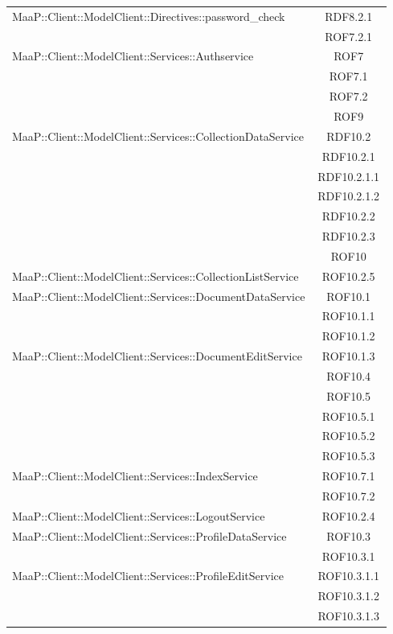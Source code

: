 \begin{center}
\begin{longtable}{|p{0.8\linewidth}|c|}
\midrule
MaaP::Client::ModelClient::Directives::password\_check
& RDF8.2.1\\
& ROF7.2.1\\

\midrule
MaaP::Client::ModelClient::Services::Authservice
& ROF7\\
& ROF7.1\\
& ROF7.2\\
& ROF9\\

\midrule
MaaP::Client::ModelClient::Services::CollectionDataService
& RDF10.2\\
& RDF10.2.1\\
& RDF10.2.1.1\\
& RDF10.2.1.2\\
& RDF10.2.2\\
& RDF10.2.3\\
& ROF10\\

\midrule
MaaP::Client::ModelClient::Services::CollectionListService
& ROF10.2.5\\

\midrule
MaaP::Client::ModelClient::Services::DocumentDataService
& ROF10.1\\
& ROF10.1.1\\
& ROF10.1.2\\

\midrule
MaaP::Client::ModelClient::Services::DocumentEditService
& ROF10.1.3\\
& ROF10.4\\
& ROF10.5\\
& ROF10.5.1\\
& ROF10.5.2\\
& ROF10.5.3\\

\midrule
MaaP::Client::ModelClient::Services::IndexService
& ROF10.7.1\\
& ROF10.7.2\\

\midrule
MaaP::Client::ModelClient::Services::LogoutService
& ROF10.2.4\\

\midrule
MaaP::Client::ModelClient::Services::ProfileDataService
& ROF10.3\\
& ROF10.3.1\\

\midrule
MaaP::Client::ModelClient::Services::ProfileEditService
& ROF10.3.1.1\\
& ROF10.3.1.2\\
& ROF10.3.1.3\\


\end{longtable}
\end{center}
